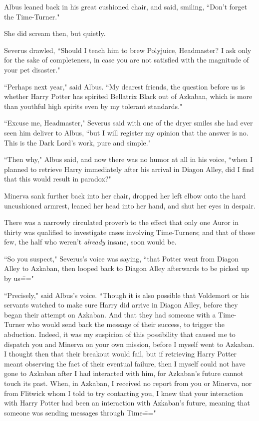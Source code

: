 Albus leaned back in his great cushioned chair, and said, smiling, ``Don't forget the Time-Turner."

She did scream then, but quietly.

Severus drawled, ``Should I teach him to brew Polyjuice, Headmaster? I ask only for the sake of completeness, in case you are not satisfied with the magnitude of your pet disaster."

``Perhaps next year," said Albus. ``My dearest friends, the question before us is whether Harry Potter has spirited Bellatrix Black out of Azkaban, which is more than youthful high spirits even by my tolerant standards."

``Excuse me, Headmaster," Severus said with one of the dryer smiles she had ever seen him deliver to Albus, ``but I will register my opinion that the answer is no. This is the Dark Lord's work, pure and simple."

``Then why," Albus said, and now there was no humor at all in his voice, ``when I planned to retrieve Harry immediately after his arrival in Diagon Alley, did I find that this would result in paradox?"

Minerva sank further back into her chair, dropped her left elbow onto the hard uncushioned armrest, leaned her head into her hand, and shut her eyes in despair.

There was a narrowly circulated proverb to the effect that only one Auror in thirty was qualified to investigate cases involving Time-Turners; and that of those few, the half who weren't \emph{already} insane, soon would be.

``So you suspect," Severus's voice was saying, ``that Potter went from Diagon Alley to Azkaban, then looped back to Diagon Alley afterwards to be picked up by us\==="

``Precisely," said Albus's voice. ``Though it is also possible that Voldemort or his servants watched to make sure Harry did arrive in Diagon Alley, before they began their attempt on Azkaban. And that they had someone with a Time-Turner who would send back the message of their success, to trigger the abduction. Indeed, it was my suspicion of this possibility that caused me to dispatch you and Minerva on your own mission, before I myself went to Azkaban. I thought then that their breakout would fail, but if retrieving Harry Potter meant observing the fact of their eventual failure, then I myself could not have gone to Azkaban after I had interacted with him, for Azkaban's future cannot touch its past. When, in Azkaban, I received no report from you or Minerva, nor from Flitwick whom I told to try contacting you, I knew that your interaction with Harry Potter had been an interaction with Azkaban's future, meaning that someone was sending messages through Time\==="

